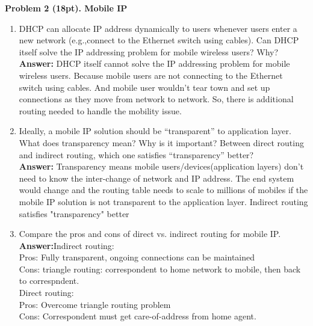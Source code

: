 \documentclass[12pt]{article}
\begin{document}
\noindent \textbf{Problem 2 (18pt). Mobile IP\\}
\begin{enumerate}
\item DHCP can allocate IP address dynamically to users whenever users enter a new network (e.g.,connect to the Ethernet switch using cables). Can DHCP itself solve the IP addressing problem for mobile wireless users? Why?\\
\textbf{Answer:} DHCP itself cannot solve the IP addressing problem for mobile wireless users. Because mobile users are not connecting to the Ethernet switch using cables. And mobile user wouldn't tear town and set up connections as they move from network to network. So, there is additional routing needed to handle the mobility issue. 

\item Ideally, a mobile IP solution should be “transparent” to application layer. What does transparency mean? Why is it important? Between direct routing and indirect routing, which one satisfies “transparency” better?\\
\textbf{Answer:} Transparency means mobile users/devices(application layers) don't need to know the inter-change of network and IP address. The end system would change and the routing table needs to scale to millions of mobiles if the mobile IP solution is not transparent to the application layer.  Indirect routing satisfies "transparency" better

\item Compare the pros and cons of direct vs. indirect routing for mobile IP.\\
\textbf{Answer:}Indirect routing:\\
Pros: Fully transparent, ongoing connections can be maintained\\
Cons: triangle routing: correspondent to home network to mobile, then back to correspndent.\\
Direct routing:\\
Pros: Overcome triangle routing problem\\
Cons: Correspondent must get care-of-address from home agent.
\end{enumerate}
\end{document}
